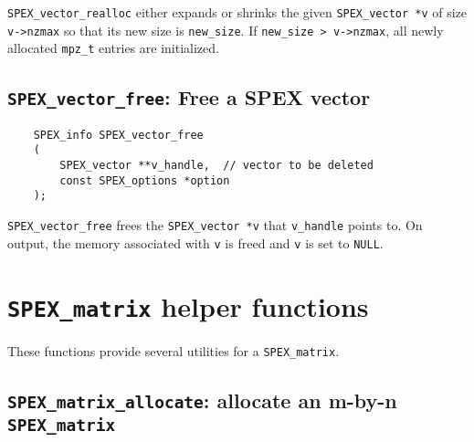 \documentclass[12pt]{report}
\theoremstyle{definition}
\begin{document}
\verb|SPEX_vector_realloc| either expands or shrinks the given \verb|SPEX_vector *v| of size \verb|v->nzmax| so that its new size is \verb|new_size|. If \verb|new_size > v->nzmax|, all newly allocated \verb|mpz_t| entries are initialized.

\subsection{\texttt{SPEX\_vector\_free}: Free a SPEX vector} \label{ss:spex_vector_free}

\begin{mdframed}[userdefinedwidth=6in]
{\footnotesize
\begin{verbatim}
    SPEX_info SPEX_vector_free
    (
        SPEX_vector **v_handle,  // vector to be deleted
        const SPEX_options *option
    ); 
\end{verbatim}
} \end{mdframed}

\verb|SPEX_vector_free| frees the \verb|SPEX_vector *v| that \verb|v_handle| points to. On output, the memory associated with \verb|v| is freed and \verb|v| is set to \verb|NULL|.

\section{\texttt{SPEX\_matrix} helper functions} \label{s:spex_matrix_functions}

These functions provide several utilities for a \verb|SPEX_matrix|.

\subsection{\texttt{SPEX\_matrix\_allocate}: allocate an m-by-n \texttt{SPEX\_matrix}}
\label{s:user:matrix_allocate}
\end{document}
